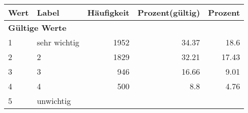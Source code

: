      \begin{longtable}{lXrrr}
     \toprule
     \textbf{Wert} & \textbf{Label} & \textbf{Häufigkeit} & \textbf{Prozent(gültig)} & \textbf{Prozent} \\
     \endhead
     \midrule
     \multicolumn{5}{l}{\textbf{Gültige Werte}}\\

     1 &
     \multicolumn{1}{X}{ sehr wichtig   } &


       \num{1952} &
       \num[round-mode=places,round-precision=2]{34,37} &
         \num[round-mode=places,round-precision=2]{18,6} \\

     2 &
     \multicolumn{1}{X}{ 2   } &


       \num{1829} &
       \num[round-mode=places,round-precision=2]{32,21} &
         \num[round-mode=places,round-precision=2]{17,43} \\

     3 &
     \multicolumn{1}{X}{ 3   } &


       \num{946} &
       \num[round-mode=places,round-precision=2]{16,66} &
         \num[round-mode=places,round-precision=2]{9,01} \\

     4 &
     \multicolumn{1}{X}{ 4   } &


       \num{500} &
       \num[round-mode=places,round-precision=2]{8,8} &
         \num[round-mode=places,round-precision=2]{4,76} \\

     5 &
     \multicolumn{1}{X}{ unwichtig   } &



\end{longtable}
